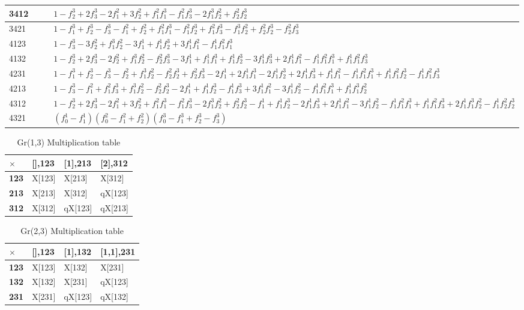 \documentclass[11pt]{article}
\begin{document}
\begin{table}[!h]
\begin{tabular}{|p{2cm}|p{6cm}|p{2cm}|p{6cm}|}
3412 & & & $1 - f_2^3 + 2f_3^3 - 2f_1^2 + 3f_2^2 + f_1^2f_1^3 - f_1^2f_3^3 - 2f_1^3f_2^2 + f_2^2f_2^3$ \\ \hline
3421 & & & $1 - f_1^3 + f_2^3 - f_3^3 - f_1^2 + f_2^2 + f_1^2f_1^3 - f_1^2f_2^3 + f_1^2f_3^3 - f_1^3f_2^2 + f_2^2f_2^3 - f_2^2f_3^3$\\ \hline
4123 & & & $1 - f_3^3 - 3f_2^2 + f_1^3f_2^2 - 3f_1^1 + f_1^1f_2^3 + 3f_1^1f_1^2 - f_1^1f_1^2f_1^3$\\ \hline
4132 & & & $1 - f_2^3 + 2f_3^3 - 2f_2^2 + f_1^3f_2^2 - f_2^2f_3^3 - 3f_1^1 + f_1^1f_1^3 + f_1^1f_2^3 - 3f_1^1f_3^3 + 2f_1^1f_1^2 - f_1^1f_1^2f_1^3 + f_1^1f_1^2f_3^3$\\ \hline
4231 & & & $1 - f_1^3 + f_2^3 - f_3^3 - f_2^2 + f_1^3f_2^2 - f_2^2f_2^3 + f_2^2f_3^3 - 2f_1^1 + 2f_1^1f_1^3 - 2f_1^1f_2^3 + 2f_1^1f_3^3 + f_1^1f_1^2 - f_1^1f_1^2f_1^3 + f_1^1f_1^2f_2^3 - f_1^1f_1^2f_3^3$\\ \hline
4213 & & & $1 - f_3^3 - f_1^2 + f_1^2f_3^3 + f_1^3f_2^2 - f_2^2f_2^3 - 2f_1^1 + f_1^1f_2^3 - f_1^1f_3^3 + 3f_1^1f_1^2 - 3f_1^1f_2^2 - f_1^1f_1^2f_1^3 + f_1^1f_1^3f_2^2$\\ \hline
4312 & & & $1 - f_2^3 + 2f_3^3 - 2f_1^2 + 3f_2^2 + f_1^2f_1^3 - f_1^2f_3^3 - 2f_1^3f_2^2 + f_2^2f_2^3 - f_1^1 + f_1^1f_2^3 - 2f_1^1f_3^3 + 2f_1^1f_1^2 - 3f_1^1f_2^2 - f_1^1f_1^2f_1^3 + f_1^1f_1^2f_3^3 + 2f_1^1f_1^3f_2^2 - f_1^1f_2^2f_2^3$\\ \hline
4321 & & & $(f_0^1 - f_1^1)(f_0^2 - f_1^2 + f_2^2)(f_0^3 - f_1^3 + f_2^3 - f_3^3)$\\ \hline
\end{tabular}
\end{table}

\newpage
\begin{table}[!h]
\centering
\caption{Gr(1,3) Multiplication table}
\begin{tabular}{|p{2cm}|p{2.5cm}|p{6cm}|p{6cm}|}
\hline
$\times$ & \textbf{[],123} & \textbf{[1],213}  & \textbf{[2],312} \\ \hline 
\textbf{123} & X[123] & X[213] & X[312] \\ \hline 
\textbf{213} & X[213] & X[312] & qX[123] \\ \hline 
\textbf{312} & X[312] & qX[123] & qX[213] \\ \hline
\end{tabular}
\end{table}

\begin{table}[!h]
\centering
\caption{Gr(2,3) Multiplication table}
\begin{tabular}{|p{2cm}|p{2.5cm}|p{6cm}|p{6cm}|}
\hline
$\times$ & \textbf{[],123} & \textbf{[1],132}  & \textbf{[1,1],231} \\ \hline 
\textbf{123} & X[123] & X[132] & X[231] \\ \hline 
\textbf{132} & X[132] & X[231] & qX[123] \\ \hline 
\textbf{231} & X[231] & qX[123] & qX[132] \\ \hline
\end{tabular}
\end{table}
\end{document}
